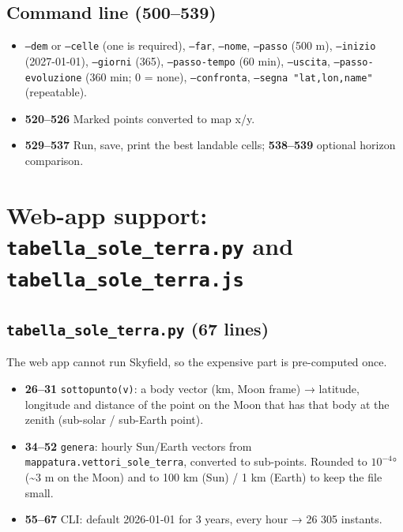 \documentclass[11pt,a4paper]{article}
\providecommand{\tightlist}{\setlength{\itemsep}{0pt}\setlength{\parskip}{0pt}}
\begin{document}
\hypertarget{command-line-500539}{%
\subsection{Command line (500--539)}\label{command-line-500539}}

\begin{itemize}
\tightlist
\item
  \texttt{--dem} or \texttt{--celle}
  (one is required), \texttt{--far},
  \texttt{--nome}, \texttt{--passo}
  (500 m), \texttt{--inizio} (2027-01-01),
  \texttt{--giorni} (365),
  \texttt{--passo-tempo} (60 min),
  \texttt{--uscita},
  \texttt{--passo-evoluzione} (360 min; 0 = none),
  \texttt{--confronta},
  \texttt{--segna "lat,lon,name"} (repeatable).
\item
  \textbf{520--526} Marked points converted to map x/y.
\item
  \textbf{529--537} Run, save, print the best landable cells;
  \textbf{538--539} optional horizon comparison.
\end{itemize}

\hypertarget{web-app-support-tabella_sole_terra.py-and-tabella_sole_terra.js}{%
\section{\texorpdfstring{Web-app support:
\texttt{tabella\_sole\_terra.py} and
\texttt{tabella\_sole\_terra.js}}{Web-app support: tabella\_sole\_terra.py and tabella\_sole\_terra.js}}\label{web-app-support-tabella_sole_terra.py-and-tabella_sole_terra.js}}

\hypertarget{tabella_sole_terra.py-67-lines}{%
\subsection{\texorpdfstring{\texttt{tabella\_sole\_terra.py} (67
lines)}{tabella\_sole\_terra.py (67 lines)}}\label{tabella_sole_terra.py-67-lines}}

The web app cannot run Skyfield, so the expensive part is pre-computed
once.

\begin{itemize}
\tightlist
\item
  \textbf{26--31} \texttt{sottopunto(v)}: a body vector
  (km, Moon frame) → latitude, longitude and distance of the point on
  the Moon that has that body at the zenith (sub-solar / sub-Earth
  point).
\item
  \textbf{34--52} \texttt{genera}: hourly Sun/Earth
  vectors from \texttt{mappatura.vettori\_sole\_terra},
  converted to sub-points. Rounded to $10^{-4}$° (\textasciitilde3 m on the
  Moon) and to 100 km (Sun) / 1 km (Earth) to keep the file small.
\item
  \textbf{55--67} CLI: default 2026-01-01 for 3 years, every hour → 26
  305 instants.
\end{itemize}
\end{document}
